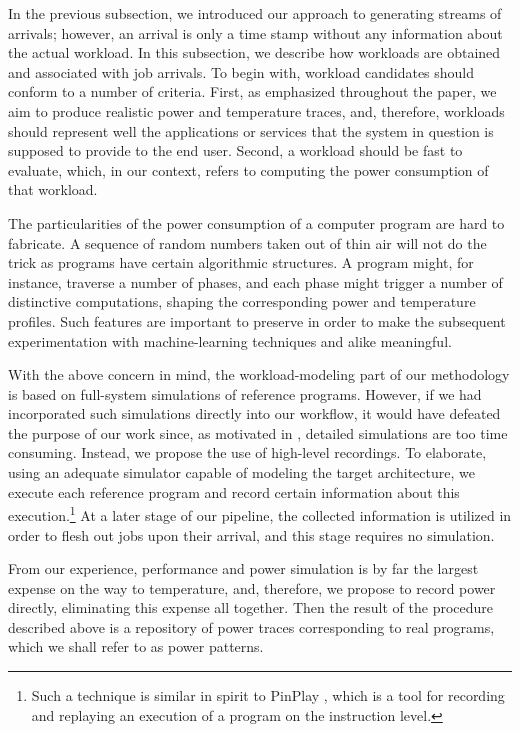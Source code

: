 In the previous subsection, we introduced our approach to generating streams of
arrivals; however, an arrival is only a time stamp without any information about
the actual workload. In this subsection, we describe how workloads are obtained
and associated with job arrivals. To begin with, workload candidates should
conform to a number of criteria. First, as emphasized throughout the paper, we
aim to produce realistic power and temperature traces, and, therefore, workloads
should represent well the applications or services that the system in question
is supposed to provide to the end user. Second, a workload should be fast to
evaluate, which, in our context, refers to computing the power consumption of
that workload.

The particularities of the power consumption of a computer program are hard to
fabricate. A sequence of random numbers taken out of thin air will not do the
trick as programs have certain algorithmic structures. A program might, for
instance, traverse a number of phases, and each phase might trigger a number of
distinctive computations, shaping the corresponding power and temperature
profiles. Such features are important to preserve in order to make the
subsequent experimentation with machine-learning techniques and alike
meaningful.

With the above concern in mind, the workload-modeling part of our methodology is
based on full-system simulations of reference programs. However, if we had
incorporated such simulations directly into our workflow, it would have defeated
the purpose of our work since, as motivated in , detailed
simulations are too time consuming. Instead, we propose the use of high-level
recordings. To elaborate, using an adequate simulator capable of modeling the
target architecture, we execute each reference program and record certain
information about this execution.\footnote{Such a technique is similar in spirit
to PinPlay \cite{patil2010}, which is a tool for recording and replaying an
execution of a program on the instruction level.} At a later stage of our
pipeline, the collected information is utilized in order to flesh out jobs upon
their arrival, and this stage requires no simulation.

From our experience, performance and power simulation is by far the largest
expense on the way to temperature, and, therefore, we propose to record power
directly, eliminating this expense all together. Then the result of the
procedure described above is a repository of power traces corresponding to real
programs, which we shall refer to as power patterns.

